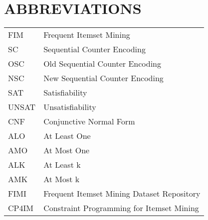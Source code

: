 
\chapter*{ABBREVIATIONS}

\begin{table}[htbp]
    \raggedright
    \begin{tabular}{ll}
        \\
        FIM   & Frequent Itemset Mining                    \\
        SC    & Sequential Counter Encoding                \\
        OSC   & Old Sequential Counter Encoding            \\
        NSC   & New Sequential Counter Encoding            \\
        SAT   & Satisfiability                             \\
        UNSAT & Unsatisfiability                           \\
        CNF   & Conjunctive Normal Form                    \\
        ALO   & At Least One                               \\
        AMO   & At Most One                                \\
        ALK   & At Least k                                 \\
        AMK   & At Most k                                  \\
        FIMI  & Frequent Itemset Mining Dataset Repository \\
        CP4IM & Constraint Programming for Itemset Mining  \\
    \end{tabular}
\end{table}